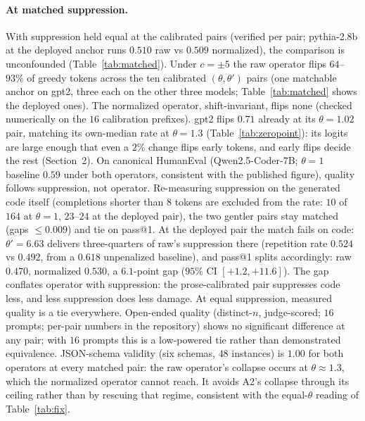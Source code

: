 \documentclass[11pt]{article}
\makeatletter
\newcommand{\thp}{\theta}
\newcommand{\passk}[1]{pass@#1}
\makeatother
\begin{document}
\paragraph{At matched suppression.} With suppression held equal at the calibrated pairs
(verified per pair; pythia-2.8b at the deployed anchor runs $0.510$ raw vs $0.509$ normalized),
the comparison is unconfounded (Table~\ref{tab:matched}). Under $c=\pm5$ the raw operator
flips $64$--$93\%$ of greedy tokens across the ten calibrated $(\thp,\thp')$ pairs (one
matchable anchor on gpt2, three each on the other three models; Table~\ref{tab:matched} shows
the deployed ones). The normalized operator, shift-invariant, flips
none (checked numerically on the $16$ calibration prefixes). gpt2 flips $0.71$ already at its
$\thp=1.02$ pair, matching its own-median rate at $\thp=1.3$ (Table~\ref{tab:zeropoint}): its
logits are large enough that even a $2\%$ change flips early tokens, and early flips decide the
rest (Section~2). On
canonical HumanEval (Qwen2.5-Coder-7B; $\thp=1$ baseline $0.59$ under both operators, consistent
with the published figure), quality follows suppression, not operator. Re-measuring suppression
on the generated code itself (completions shorter than $8$ tokens are excluded from the rate:
$10$ of $164$ at $\thp=1$, $23$--$24$ at the deployed pair), the two gentler pairs stay matched (gaps $\le0.009$) and tie on
\passk{1}. At the deployed pair the match fails on code: $\thp'=6.63$ delivers three-quarters of
raw's suppression there (repetition rate $0.524$ vs $0.492$, from a $0.618$ unpenalized
baseline), and \passk{1} splits accordingly:
raw $0.470$, normalized $0.530$, a $6.1$-point gap ($95\%$ CI $[{+}1.2, {+}11.6]$). The gap
conflates operator with suppression: the prose-calibrated pair suppresses code less, and less
suppression does less damage. At equal suppression, measured quality is a tie everywhere. Open-ended quality
(distinct-$n$, judge-scored; $16$ prompts; per-pair numbers in the repository) shows no
significant difference at any pair; with $16$ prompts this is a low-powered tie rather than
demonstrated equivalence. JSON-schema validity (six schemas,
$48$ instances) is $1.00$ for both operators at every matched pair: the raw operator's collapse
occurs at $\thp\approx1.3$, which the normalized operator cannot reach. It avoids A2's collapse
through its ceiling rather than by rescuing that regime, consistent with the equal-$\thp$
reading of Table~\ref{tab:fix}.
\end{document}
